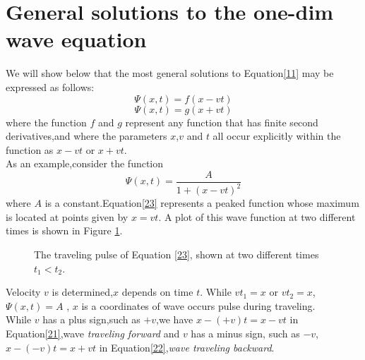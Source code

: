 \documentclass[12pt]{article}
\numberwithin{equation}{section}
\begin{document}
\section{General solutions to the one-dim wave equation}
    We will show below that the most general solutions to Equation\eqref{11} may be expressed as follows:
    \begin{equation}
        \Psi(x,t)=f(x-vt)\label{21}
    \end{equation}
    \begin{equation}
        \Psi(x,t)=g(x+vt)\label{22}
    \end{equation}
    \indent where the function $f$ and $g$ represent any function that has finite second derivatives,and where 
    the parameters $x$,$v$ and $t$ all occur explicitly within the function as $x-vt$ or $x+vt$.\\
    \indent As an example,consider the function
    \begin{equation}
        \Psi(x,t)=\frac{A}{1+(x-vt)^2}\label{23}
    \end{equation}
    \indent where $A$ is a constant.Equation\eqref{23} represents a peaked function whose maximum is located at points given by $x=vt$. A plot of this wave function at two different times is shown in Figure \ref{f1}.\\
    \begin{figure}[h]
        \centering
        \caption{The traveling pulse of Equation \eqref{23}, shown at two different times $t_1<t_2$.}
        \label{f1}
    \end{figure}
    \newpage
    \indent Velocity $v$ is determined,$x$ depends on time $t$. While $vt_1=x$ or $vt_2=x$, $\Psi(x,t)=A$ , $x$ is a coordinates of wave occurs pulse during traveling.\\
    \indent While $v$ has a plus sign,such as $+v$,we have $x-(+v)t=x-vt$ in Equation\eqref{21},wave \emph{traveling forward} and $v$ has a minus sign, such as $-v$,$x-(-v)t=x+vt$ in Equation\eqref{22},\emph{wave traveling backward}.
\end{document}
